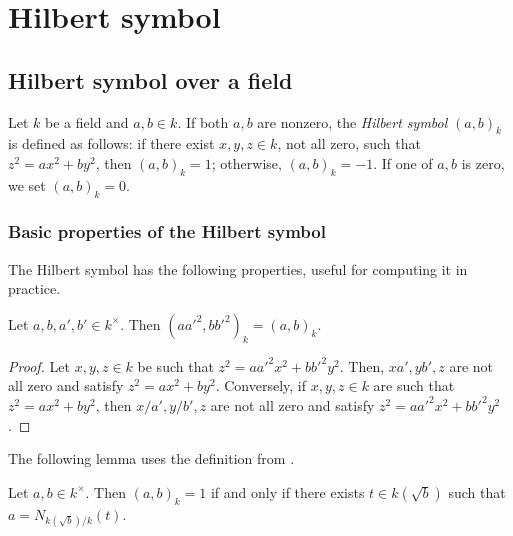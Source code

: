 \chapter{Hilbert symbol}

\section{Hilbert symbol over a field}

\begin{definition}
	\label{def:Hilbert_symbol}
	\leanok
	Let $k$ be a field and $a, b \in k$. If both $a,b$ are nonzero, the \emph{Hilbert symbol} $(a, b)_k$ is defined as
	follows: if there exist $x, y, z \in k$, not all zero, such that $z^2 = ax^2 + by^2$,
	then $(a, b)_k = 1$; otherwise, $(a, b)_k = -1$. If one of $a,b$ is zero, we set $(a, b)_k = 0$.
\end{definition}


\subsection{Basic properties of the Hilbert symbol}

The Hilbert symbol has the following properties, useful for computing it in practice.

\begin{lemma}
	\label{lem:well_defined_up_to_squares}
	\leanok
Let $a, b, a', b' \in k^\times$. Then $(a a'^2, b b'^2)_k = (a,b)_k$.
\end{lemma}

\begin{proof}
	\leanok
	Let $x, y, z \in k$ be such that $z^2 = a a'^2 x^2 + b b'^2 y^2$. Then, $xa', yb', z$ are not all
	zero and satisfy $z^2 = ax^2 + by^2$. Conversely, if $x, y, z \in k$ are such that
	$z^2 = ax^2 + by^2$, then $x/a', y/b', z$ are not all zero and satisfy
	$z^2 = a a'^2 x^2 + b b'^2 y^2$.
\end{proof}

The following lemma uses the definition  from \mathlib.

\begin{lemma}
	\label{lem:eq_one_iff}
	\leanok
	Let $a, b \in k^\times$. Then $(a, b)_k = 1$ if and only if there exists $t \in k(\sqrt{b})$ such
	that $a = N_{k(\sqrt{b})/k}(t)$.
\end{lemma}

